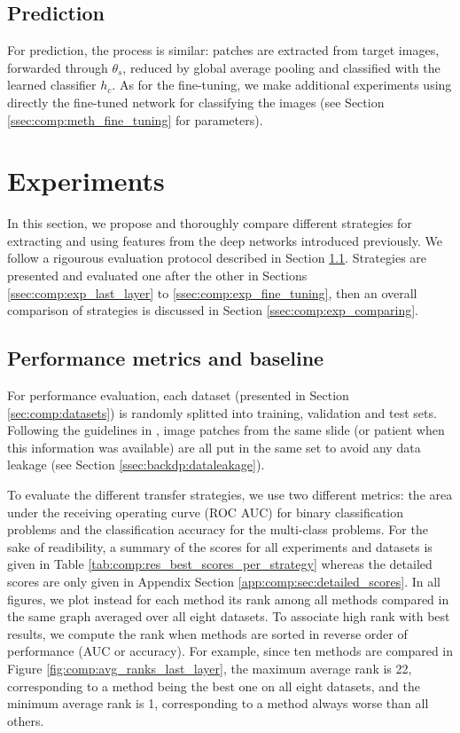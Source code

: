 \subsection{Prediction}
\label{ssec:comp:prediction}
For prediction, the process is similar: patches are extracted from target images, forwarded through $\theta_s$, reduced by global average pooling and classified with the learned classifier $h_c$. As for the fine-tuning, we make additional experiments using directly the fine-tuned network for classifying the images (see Section \ref{ssec:comp:meth_fine_tuning} for parameters).

\section{Experiments}
\label{sec:comp:experiments}

In this section, we propose and thoroughly compare different strategies for extracting and using features from the deep networks introduced previously. We follow a rigourous evaluation protocol described in Section \ref{ssec:comp:protocol}. Strategies are presented and evaluated one after the other in Sections \ref{ssec:comp:exp_last_layer} to \ref{ssec:comp:exp_fine_tuning}, then an overall comparison of strategies is discussed in Section \ref{ssec:comp:exp_comparing}.


\subsection{Performance metrics and baseline}
\label{ssec:comp:protocol}
For performance evaluation, each dataset (presented in Section \ref{sec:comp:datasets}) is randomly splitted into training, validation and test sets. Following the guidelines in \cite{maree2017need}, image patches from the same slide (or patient when this information was available) are all put in the same set to avoid any data leakage (see Section \ref{ssec:backdp:dataleakage}). %

To evaluate the different transfer strategies, we use two different metrics: the area under the receiving operating curve (ROC AUC) for binary classification problems and the classification accuracy for the multi-class problems. For the sake of readibility, a summary of the scores for all experiments and datasets is given in Table \ref{tab:comp:res_best_scores_per_strategy} whereas the detailed scores are only given in Appendix Section \ref{app:comp:sec:detailed_scores}. In all figures, we plot instead for each method its rank among all methods compared in the same graph averaged over all eight datasets. To associate high rank with best results, we compute the rank when methods are sorted in reverse order of performance (AUC or accuracy). For example, since ten methods are compared in Figure \ref{fig:comp:avg_ranks_last_layer}, the maximum average rank is 22, corresponding to a method being the best one on all eight datasets, and the minimum average rank is 1, corresponding to a method always worse than all others.

